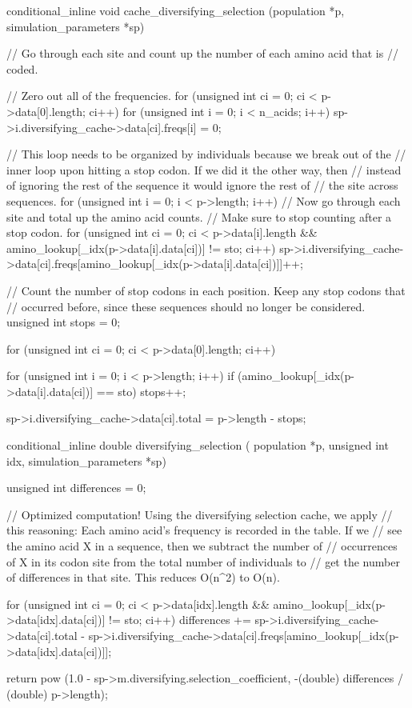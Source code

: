 \documentclass{article}
\begin{document}
\begin{ccode}
conditional_inline void cache_diversifying_selection (population *p,
			  simulation_parameters *sp) {
  // Go through each site and count up the number of each amino acid that is
  // coded.

  // Zero out all of the frequencies.
  for (unsigned int ci = 0; ci < p->data[0].length; ci++)
    for (unsigned int i = 0; i < n_acids; i++)
      sp->i.diversifying_cache->data[ci].freqs[i] = 0;

  // This loop needs to be organized by individuals because we break out of the
  // inner loop upon hitting a stop codon. If we did it the other way, then
  // instead of ignoring the rest of the sequence it would ignore the rest of
  // the site across sequences.
  for (unsigned int i = 0; i < p->length; i++)
    // Now go through each site and total up the amino acid counts.
    // Make sure to stop counting after a stop codon.
    for (unsigned int ci = 0;
	 ci < p->data[i].length &&
	   amino_lookup[_idx(p->data[i].data[ci])] != sto;
	 ci++)
      sp->i.diversifying_cache->data[ci].freqs[amino_lookup[_idx(p->data[i].data[ci])]]++;

  // Count the number of stop codons in each position. Keep any stop codons that
  // occurred before, since these sequences should no longer be considered.
  unsigned int stops = 0;

  for (unsigned int ci = 0; ci < p->data[0].length; ci++) {
    for (unsigned int i = 0; i < p->length; i++)
      if (amino_lookup[_idx(p->data[i].data[ci])] == sto)
	stops++;

    sp->i.diversifying_cache->data[ci].total = p->length - stops;
  }
}

conditional_inline double diversifying_selection (
			    population *p, unsigned int idx,
			    simulation_parameters *sp) {
  unsigned int differences = 0;

  // Optimized computation! Using the diversifying selection cache, we apply
  // this reasoning: Each amino acid's frequency is recorded in the table. If we
  // see the amino acid X in a sequence, then we subtract the number of
  // occurrences of X in its codon site from the total number of individuals to
  // get the number of differences in that site. This reduces O(n^2) to O(n).

  for (unsigned int ci = 0;
       ci < p->data[idx].length && amino_lookup[_idx(p->data[idx].data[ci])] != sto;
       ci++)
    differences += sp->i.diversifying_cache->data[ci].total -
		   sp->i.diversifying_cache->data[ci].freqs[amino_lookup[_idx(p->data[idx].data[ci])]];

  return pow (1.0 - sp->m.diversifying.selection_coefficient,
	      -(double) differences / (double) p->length);
}
\end{ccode}
\end{document}
